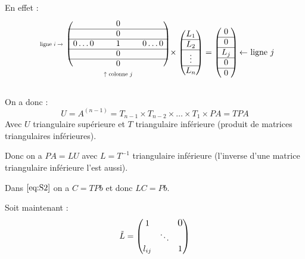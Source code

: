 \documentclass[a4paper,11pt]{article}
\theoremstyle{plain} %
\begin{document}
    En effet : 
\[
    \begin{blockarray}{cccc}
        \begin{block}{c(ccc)}
            & & 0 & \\
            \cline{2-4}
            & & 0 & \\
            \cline{2-4}
            \text{\scalebox{0.7}{ligne $i \rightarrow$}} & 0 \dots 0 & 1 & 0 \dots 0 \\
            \cline{2-4}
            & & 0 & \\
            \cline{2-4}
            & & 0 & \\
        \end{block}
        & & \text{\scalebox{0.7}{$\uparrow$ colonne $j$}} & & \\
    \end{blockarray}
    \times
    \begin{pmatrix}
        L_1 \\ \hline
        L_2 \\ \hline
        \vdots \\ \hline
        L_n
    \end{pmatrix}
    =
    \begin{pmatrix}
        0 \\ \hline
        0 \\ \hline
        L_j \\ \hline
        0 \\ \hline
        0
    \end{pmatrix} \text{$\leftarrow$ ligne $j$}
\]

On a donc :
\[
    U = A^{(n-1)} = T_{n-1} \times T_{n-2} \times \dots \times T_1 \times PA = TPA
\]
Avec $U$ triangulaire supérieure et $T$ triangulaire inférieure (produit de matrices triangulaires inférieures).

Donc on a $PA=LU$ avec $L=T^{-1}$ triangulaire inférieure (l'inverse d'une matrice triangulaire inférieure l'est aussi).

\begin{remark}
    Dans $\ref{eq:S2}$ on a $C=TPb$ et donc $LC=Pb$.
\end{remark}

Soit maintenant :\[
    \tilde{L} =
    \begin{pmatrix}
        1 & & \scalebox{1.2}{0} \\
        & \ddots & \\
        l_{ij} & & 1
    \end{pmatrix}
\]
\end{document}
